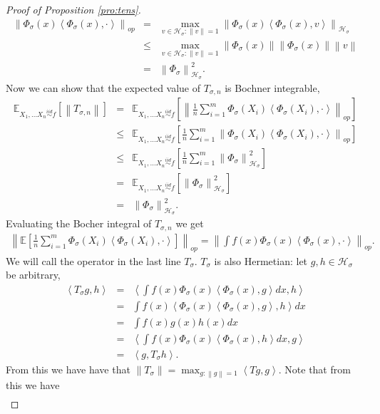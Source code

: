 \documentclass{article} %
\def\hsig{{\mathcal{H}_\sigma}}
\def\fm{{\Phi_\sigma}} %
\def\l{\left}
\def\r{\right}
\def\simiid{\overset{iid}{\sim}}
\theoremstyle{definition}
\begin{document}
\begin{proof}[Proof of Proposition \ref{pro:tens}]
        \begin{eqnarray*}
            \l\|\fm(x)\l<\fm(x),\cdot\r>\r\|_{op}
            &=& \max_{v\in \hsig: \l\|v\r\| = 1}\l\|\fm(x)\l<\fm(x),v\r>\r\|_\hsig\\
            &\le& \max_{v\in \hsig: \l\|v\r\| = 1}\l\|\fm(x)\r\| \l\|\fm(x)\r\| \l\|v\r\|\\
            &=& \l\|\fm\r\|_\hsig^2.
        \end{eqnarray*}
        Now we can show that the expected value of $T_{\sigma,n}$ is Bochner integrable,
        \begin{eqnarray*}
            \mathbb{E}_{X_1,\ldots X_n \simiid f}\left[\l\| T_{\sigma,n}\r\|  \right]
            &=& \mathbb{E}_{X_1,\ldots X_n \simiid f}\left[\l\|\frac{1}{n}\sum_{i=1}^m \fm\left( X_i \right)\l<\fm(X_i),\cdot \r>\r\|_{op}\r]\\
            &\le& \mathbb{E}_{X_1,\ldots X_n \simiid f}\left[\frac{1}{n}\sum_{i=1}^m \l\|\fm\left( X_i \right)\l<\fm(X_i),\cdot \r>\r\|_{op}\r]\\
            &\le& \mathbb{E}_{X_1,\ldots X_n \simiid f}\left[\frac{1}{n}\sum_{i=1}^m \l\|\fm\r\|_\hsig^2\r]\\
            &=& \mathbb{E}_{X_1,\ldots X_n \simiid f}\left[ \l\|\fm\r\|_\hsig^2\r]\\
            &=& \l\|\fm\r\|_\hsig^2.
        \end{eqnarray*}
        Evaluating the Bocher integral of $T_{\sigma,n}$ we get
	\begin{eqnarray*}
		\l\|  \mathbb{E}\left[ \frac{1}{n} \sum_{i=1}^m \fm\left( X_i \right)\l<\fm(X_i),\cdot \r>\r]\r\|_{op} = \l\| \int f(x) \fm(x) \l<\fm(x),\cdot\r>\r\|_{op}.
	\end{eqnarray*}
        We will call the operator in the last line $T_\sigma$.
	$T_\sigma$ is also Hermetian: let $g,h\in \hsig$ be arbitrary,
	\begin{eqnarray*}
		\l<T_\sigma g,h\r>
		&=&  \l<\int f(x) \fm(x) \l<\fm(x),g\r>dx ,h\r>\\ 
		&=&  \int f(x)\l< \fm(x) \l<\fm(x),g\r> ,h\r>dx\\ 
		&=&  \int f(x) g(x) h(x) dx\\ 
		&=&  \l<\int f(x) \fm(x) \l<\fm(x),h\r>dx ,g\r>\\ 
		&=& \l<g,T_\sigma h\r>.
	\end{eqnarray*}
	From this we have have that $\l\|T_\sigma\r\| = \max_{g:\l\|g\r\|= 1} \l<Tg,g\r>$. Note that from this we have
	\begin{eqnarray*}

\end{eqnarray*}
\end{proof}
\end{document}
